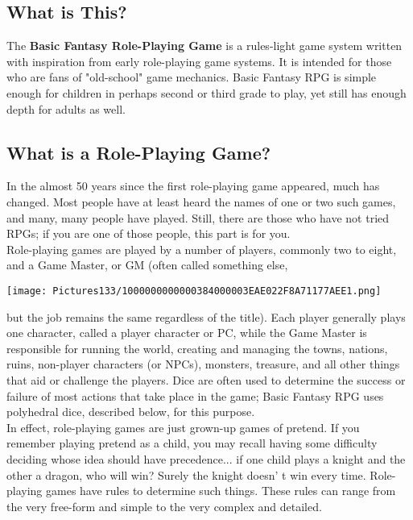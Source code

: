 \documentclass[a4paper,twoside,openany,10pt]{book}
\begin{document}
\begin{multicols}{2}

\subsection{What is This?}\label{what-is-this}

The \textbf{Basic Fantasy Role-Playing Game} is a rules-light game system written with inspiration from early role-playing game systems. It is intended for those who are fans of "old-school" game mechanics. Basic Fantasy RPG is simple enough for children in perhaps second or third
grade to play, yet still has enough depth for adults as well. 

\subsection{What is a Role-Playing Game?}\label{what-is-a-role-playing-game}

In the almost 50 years since the first role-playing game appeared, much has changed. Most people have at least heard the names of one or two such games, and many, many people have played. Still, there are those who have not tried RPGs; if you are one of those people, this part is for you.\\

Role-playing games are played by a number of players, commonly two to eight, and a Game Master, or GM (often called something else,

\texttt{[image: Pictures133/1000000000000384000003EAE022F8A71177AEE1.png]}

but the job remains the same regardless of the title). Each player generally plays one character, called a player character or PC, while the Game Master is responsible for running the world, creating and managing the towns, nations, ruins, non-player characters (or NPCs), monsters, treasure, and all other things that aid or challenge the players. Dice are often used to determine the success or failure of most actions that take place in the game; Basic Fantasy RPG uses polyhedral dice, described below, for this purpose.\\

In effect, role-playing games are just grown-up games of pretend. If you remember playing pretend as a child, you may recall having some difficulty deciding whose idea should have precedence... if one child plays a knight and the other a dragon, who will win? Surely the knight doesn' t win every time. Role-playing games have rules to determine such things. These rules can range from the very free-form and simple to the very complex and detailed.


\end{multicols}
\end{document}
